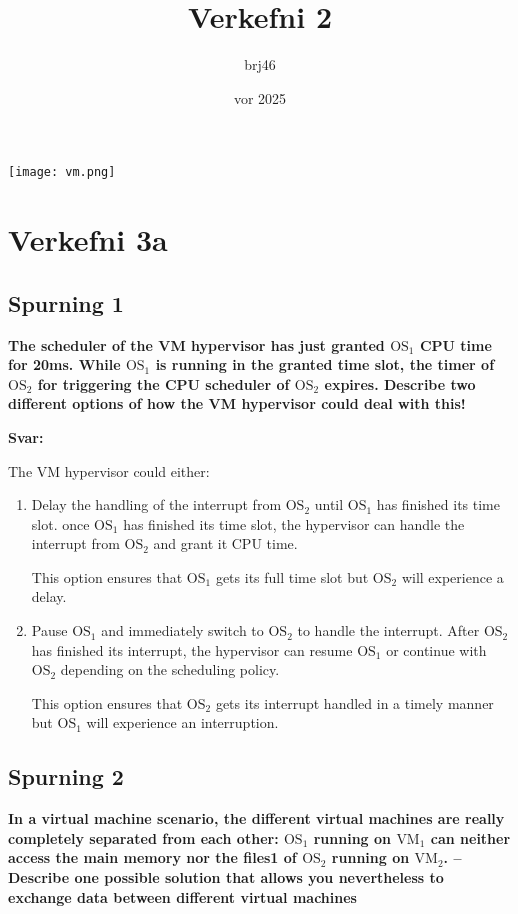 \documentclass{article}
\title{Verkefni 2}
\author{brj46 }
\date{vor 2025}
\newcommand{\sv}{\textbf{Svar:}}
\newcommand{\bo}[1]{\textbf{#1}}
\begin{document}
\maketitle

\vspace{5em}

\begin{center}
    \texttt{[image: vm.png]}
\end{center}

\newpage

\section{Verkefni 3a}
\subsection{Spurning 1}
\bo{The scheduler of the VM hypervisor has just granted $\text{OS}_1$ CPU time for 20ms. While $\text{OS}_1$
is running in the granted time slot, the timer of $\text{OS}_2$ for triggering the CPU scheduler of
$\text{OS}_2$ expires. Describe two different options of how the VM hypervisor could deal with
this!}

\sv


The VM hypervisor could either: 

\begin{enumerate}
    \item Delay the handling of the interrupt from $\text{OS}_2$ until $\text{OS}_1$ has finished its time slot.
    once $\text{OS}_1$ has finished its time slot, the hypervisor can handle the interrupt from $\text{OS}_2$ and grant it CPU time.

    This option ensures that $\text{OS}_1$ gets its full time slot but $\text{OS}_2$ will experience a delay.

    \item Pause $\text{OS}_1$ and immediately switch to $\text{OS}_2$ to handle the interrupt. After $\text{OS}_2$ has finished its interrupt, the hypervisor can resume $\text{OS}_1$ 
    or continue with $\text{OS}_2$ depending on the scheduling policy.

    This option ensures that $\text{OS}_2$ gets its interrupt handled in a timely manner but $\text{OS}_1$ will experience an interruption.
\end{enumerate}


\subsection{Spurning 2}
\bo{In a virtual machine scenario, the different virtual machines are really completely separated
from each other: $\text{OS}_1$ running on $\text{VM}_1$ can neither access the main memory nor
the files1 of $\text{OS}_2$ running on $\text{VM}_2$. – Describe one possible solution that allows you
nevertheless to exchange data between different virtual machines}
\end{document}
